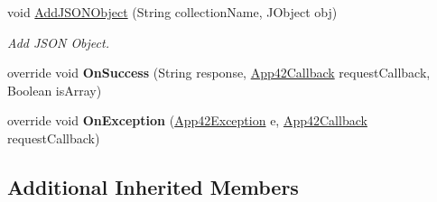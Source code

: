 \begin{DoxyCompactItemize}
\item 
void \hyperlink{classcom_1_1shephertz_1_1app42_1_1paas_1_1sdk_1_1windows_1_1game_1_1_score_board_service_a9fc565060a416cbf3f454eef3b4cd807}{Add\+J\+S\+O\+N\+Object} (String collection\+Name, J\+Object obj)
\begin{DoxyCompactList}\small\item\em Add J\+S\+O\+N Object. \end{DoxyCompactList}\item 
\hypertarget{classcom_1_1shephertz_1_1app42_1_1paas_1_1sdk_1_1windows_1_1game_1_1_score_board_service_a8b5be35a24a060ac91ebf18ebe7e1f71}{override void {\bfseries On\+Success} (String response, \hyperlink{interfacecom_1_1shephertz_1_1app42_1_1paas_1_1sdk_1_1windows_1_1_app42_callback}{App42\+Callback} request\+Callback, Boolean is\+Array)}\label{classcom_1_1shephertz_1_1app42_1_1paas_1_1sdk_1_1windows_1_1game_1_1_score_board_service_a8b5be35a24a060ac91ebf18ebe7e1f71}

\item 
\hypertarget{classcom_1_1shephertz_1_1app42_1_1paas_1_1sdk_1_1windows_1_1game_1_1_score_board_service_a78014d921ce5b886b4065307889f0a83}{override void {\bfseries On\+Exception} (\hyperlink{classcom_1_1shephertz_1_1app42_1_1paas_1_1sdk_1_1windows_1_1_app42_exception}{App42\+Exception} e, \hyperlink{interfacecom_1_1shephertz_1_1app42_1_1paas_1_1sdk_1_1windows_1_1_app42_callback}{App42\+Callback} request\+Callback)}\label{classcom_1_1shephertz_1_1app42_1_1paas_1_1sdk_1_1windows_1_1game_1_1_score_board_service_a78014d921ce5b886b4065307889f0a83}

\end{DoxyCompactItemize}
\subsection*{Additional Inherited Members}


